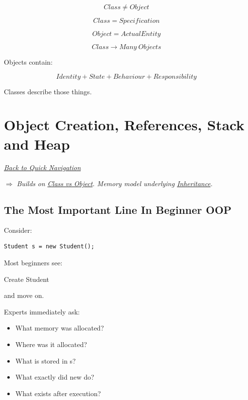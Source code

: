 \documentclass[11pt,a4paper]{book}
\begin{document}
\[
Class
\neq
Object
\]

\[
Class
=
Specification
\]

\[
Object
=
Actual Entity
\]

\[
Class
\rightarrow
Many\ Objects
\]

Objects contain:

\[
Identity
+
State
+
Behaviour
+
Responsibility
\]

Classes describe those things.

\chapter{Object Creation, References, Stack and Heap}

\smallskip
\noindent
\hyperref[sec:quick_nav]{\emph{Back to Quick Navigation}}

\smallskip
\noindent
\textcolor{RosettaRoyalPurple}{$\Rightarrow$}
\emph{Builds on \hyperref[chap:class_vs_object]{Class vs Object}. Memory model underlying \hyperref[chap:inheritance]{Inheritance}.}


\section{The Most Important Line In Beginner OOP}

Consider:

\begin{verbatim}
Student s = new Student();
\end{verbatim}

Most beginners see:

\begin{center}
Create Student
\end{center}

and move on.

Experts immediately ask:

\begin{itemize}
\item What memory was allocated?
\item Where was it allocated?
\item What is stored in s?
\item What exactly did new do?
\item What exists after execution?
\end{itemize}
\end{document}
